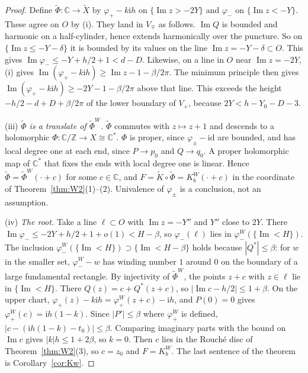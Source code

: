 \documentclass[11pt]{amsart}
\theoremstyle{definition}
\newcommand{\Kk}{K}
\newcommand{\ii}{\mathrm{i}}
\begin{document}
\begin{proof}
Define $\tilde\Phi:\mathbb C\to\tilde X$ by $\varphi_+-k\ii h$ on
$\{\operatorname{Im}z>-2Y\}$ and $\varphi_-$ on $\{\operatorname{Im}z<-Y\}$.
These agree on $O$ by (i).  They land in $V_\mp$ as follows.
$\operatorname{Im}Q$ is bounded and harmonic on a half-cylinder, hence extends
harmonically over the puncture.  So on $\{\operatorname{Im}z\le-Y-\delta\}$ it is
bounded by its values on the line $\operatorname{Im}z=-Y-\delta\subset O$.
This gives $\operatorname{Im}\varphi_-\le-Y+h/2+1<d-D$.  Likewise, on a line
in $O$ near $\operatorname{Im}z=-2Y$, (i) gives
$\operatorname{Im}(\varphi_+-k\ii h)\ge\operatorname{Im}z-1-\beta/2\pi$.  The minimum
principle then gives $\operatorname{Im}(\varphi_+-k\ii h)\ge-2Y-1-\beta/2\pi$
above that line.  This exceeds the height
$-h/2-d+D+\beta/2\pi$ of the lower boundary of $V_+$, because
$2Y<h-Y_0-D-3$.

(iii) \emph{$\tilde\Phi$ is a translate of $\tilde\Phi^W$.}  $\tilde\Phi$
commutes with $z\mapsto z+1$ and descends to a holomorphic
$\Phi:\mathbb C/\mathbb Z\to X\cong\mathbb C^*$.  $\Phi$ is proper, since
$\varphi_\pm-\mathrm{id}$ are bounded, and has local degree one at each end,
since $P\to p_0$ and $Q\to q_0$.  A proper holomorphic map of $\mathbb C^*$ that
fixes the ends with local degree one is linear.  Hence
$\tilde\Phi=\tilde\Phi^W(\cdot+c)$ for some $c\in\mathbb C$, and
$F=\tilde K\circ\tilde\Phi=\Kk^W_b(\cdot+c)$ in the coordinate of
Theorem~\ref{thm:W2}(1)--(2).  Univalence of $\varphi_\pm$ is a conclusion, not
an assumption.

(iv) \emph{The root.}  Take a line $\ell\subset O$ with
$\operatorname{Im}z=-Y''$ and $Y''$ close to $2Y$.  There
$\operatorname{Im}\varphi_-\le-2Y+h/2+1+o(1)<H-\beta$, so $\varphi_-(\ell)$ lies
in $\varphi_-^W(\{\operatorname{Im}<H\})$.  The inclusion
$\varphi_-^W(\{\operatorname{Im}<H\})\supset\{\operatorname{Im}<H-\beta\}$ holds because
$|Q^*|\le\beta$: for $w$ in the smaller set, $\varphi^W_--w$ has winding
number $1$ around $0$ on the boundary of a large fundamental rectangle.  By injectivity of
$\tilde\Phi^W$, the points $z+c$ with $z\in\ell$ lie in
$\{\operatorname{Im}<H\}$.  There $Q(z)=c+Q^*(z+c)$, so
$|\operatorname{Im}c-h/2|\le1+\beta$.  On the upper chart,
$\varphi_+(z)-k\ii h=\varphi^W_+(z+c)-\ii h$, and $P(0)=0$ gives
$\varphi^W_+(c)=\ii h(1-k)$.  Since $|P'|\le\beta$ where $\varphi^W_+$ is defined,
$|c-(\ii h(1-k)-t_0)|\le\beta$.  Comparing imaginary parts with the bound on
$\operatorname{Im}c$ gives $|k|h\le1+2\beta$, so $k=0$.  Then $c$ lies in the
Rouch\'e disc of Theorem~\ref{thm:W2}(3), so $c=z_0$ and $F=\Kk^W_b$.  The last
sentence of the theorem is Corollary~\ref{cor:Kw}.
\end{proof}
\end{document}
